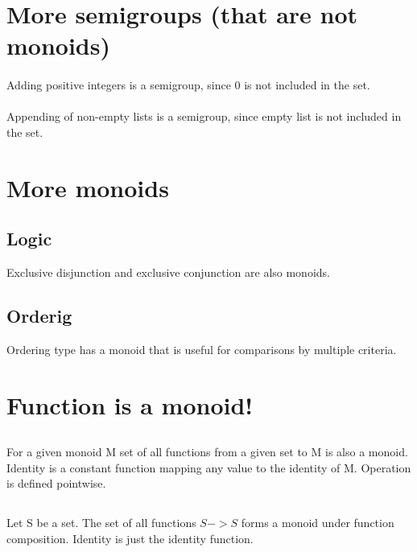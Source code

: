 \documentclass{article}
\begin{document}
    \section{More semigroups (that are not monoids)}

    \paragraph{}
    Adding positive integers is a semigroup, since $0$ is not included in the set.

    \paragraph{}
    Appending of non-empty lists is a semigroup, since empty list is not included in the set.

    \section{More monoids}

    \subsection{Logic}

    Exclusive disjunction and exclusive conjunction are also monoids.

    \subsection{Orderig}

    Ordering type has a monoid that is useful for comparisons by multiple criteria.

    \newpage

    \section{Function is a monoid!}

    \subsection{}
    For a given monoid M set of all functions from a given set to M is also a monoid. 
    Identity is a constant function mapping any value to the identity of M. Operation is defined pointwise.

    \subsection{}
    Let S be a set. The set of all functions $S -> S$ forms a monoid under function composition. Identity is just the identity function.
\end{document}
